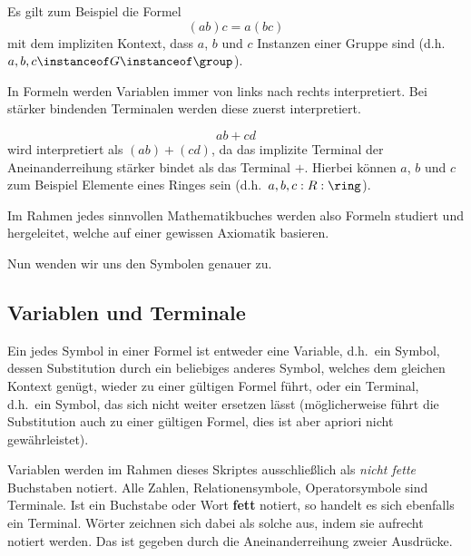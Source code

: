 \begin{example}[Assoziativität]
    Es gilt zum Beispiel die Formel
    $$
    (ab)c=a(bc)
    $$
    mit dem impliziten Kontext, dass $a$, $b$ und $c$ Instanzen einer Gruppe sind (d.h.~    $a,b,c\instanceof G\instanceof \group$).
\end{example}

\begin{convention}
    In Formeln werden Variablen immer von links nach rechts
interpretiert. Bei stärker bindenden Terminalen werden diese zuerst interpretiert.
\end{convention}

\begin{example}
    $$
    ab+cd
    $$
    wird interpretiert als $(ab)+(cd)$, da das implizite Terminal der Aneinanderreihung stärker
    bindet als das Terminal $+$. Hierbei können $a$, $b$ und $c$ zum Beispiel Elemente eines
    Ringes sein (d.h.~$a,b,c:R:\ring$).
\end{example}

Im Rahmen jedes sinnvollen Mathematikbuches werden also Formeln studiert und hergeleitet, welche
auf einer gewissen Axiomatik basieren.

Nun wenden wir uns den Symbolen genauer zu.

\subsection{Variablen und Terminale}

Ein jedes Symbol in einer Formel ist entweder eine Variable, d.h.~ein Symbol, dessen
Substitution durch ein beliebiges anderes Symbol, welches dem gleichen Kontext genügt, wieder zu einer gültigen Formel führt, oder ein
Terminal, d.h.~ein Symbol, das sich nicht weiter ersetzen lässt (möglicherweise führt die Substitution
auch zu einer gültigen Formel, dies ist aber apriori nicht gewährleistet).

\begin{notation}
    Variablen werden im Rahmen dieses Skriptes ausschließlich als \textit{nicht fette} Buchstaben notiert. 
    Alle Zahlen, Relationensymbole, Operatorsymbole sind Terminale. Ist ein Buchstabe oder Wort
    \textbf{fett} notiert, so handelt es sich ebenfalls ein Terminal. Wörter zeichnen sich dabei
    als solche aus, indem sie aufrecht notiert werden.
    Das  ist gegeben durch die
    Aneinanderreihung zweier Ausdrücke.
\end{notation}

